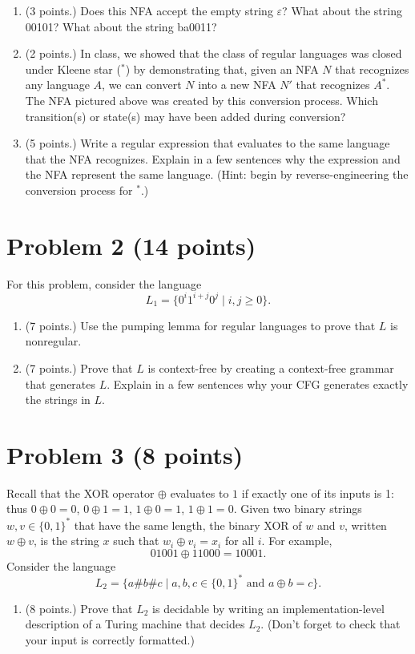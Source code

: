 \documentclass[letterpaper,11pt,twoside]{article}
\theoremstyle{plain}
\theoremstyle{definition}
\theoremstyle{remark}
\theoremstyle{restate}
\begin{document}
    
    \begin{enumerate}
        \item (3 points.) Does this NFA accept the empty string $\varepsilon$? What about the string 00101? What about the string ba0011?
        
        \item (2 points.) In class, we showed that the class of regular languages was closed under Kleene star ($^*$) by demonstrating that, given an NFA $N$ that recognizes any language $A$, we can convert $N$ into a new NFA $N'$ that recognizes $A^*$. The NFA pictured above was created by this conversion process. Which transition(s) or state(s) may have been added during conversion?
        
        \item (5 points.) Write a regular expression that evaluates to the same language that the NFA recognizes. Explain in a few sentences why the expression and the NFA represent the same language. (Hint: begin by reverse-engineering the conversion process for $^*$.)
    \end{enumerate}
    
\clearpage
\section{Problem 2 (14 points)}
    For this problem, consider the language
    \[
        L_1 = \{0^i1^{i+j}0^j \; | \; i, j \geq 0 \}.
    \]
    \begin{enumerate}
        \item (7 points.) Use the pumping lemma for regular languages to prove that $L$ is nonregular.
        
        \item (7 points.) Prove that $L$ is context-free by creating a context-free grammar that generates $L$. Explain in a few sentences why your CFG generates exactly the strings in $L$.
    \end{enumerate}

\clearpage
\section{Problem 3 (8 points)}
    Recall that the XOR operator $\oplus$ evaluates to $1$ if exactly one of its inputs is 1: thus $0 \oplus 0 = 0$, $0 \oplus 1 = 1$, $1 \oplus 0 = 1$, $1 \oplus 1 = 0$. Given two binary strings  $w, v \in \{0,1\}^*$ that have the same length, the binary XOR of $w$ and $v$, written $w \oplus v$, is the string $x$ such that $w_i \oplus v_i = x_i$ for all $i$. For example,
    \[
        01001 \oplus 11000 = 10001.
    \]
    Consider the language 
    \[
        L_2 = \{ a \# b \# c \; | \; a, b, c \in \{0,1\}^* \text{ and } a \oplus b = c \}.
    \]
    \begin{enumerate}
        \item (8 points.) Prove that $L_2$ is decidable by writing an implementation-level description of a Turing machine that decides $L_2$. (Don't forget to check that your input is correctly formatted.) 
    \end{enumerate}
\end{document}
